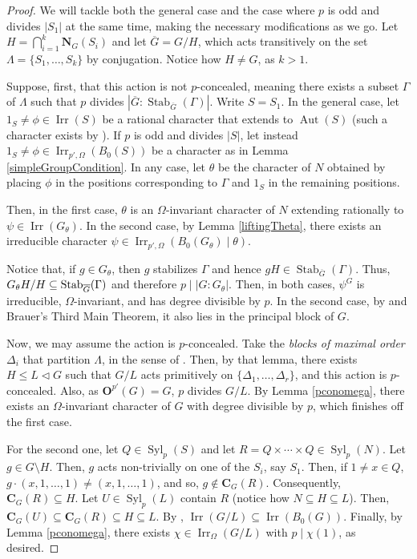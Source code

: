 \documentclass[12pt]{amsart}
\theoremstyle{theorem}
\theoremstyle{definition}
\newcommand{\bC} {\mathbf C}
\newcommand{\bO}{{\mathbf O}}
\newcommand{\bN} {\mathbf N}
\newcommand{\Aut}{{\operatorname{Aut}}}
\newcommand{\Irr}{{\operatorname{Irr}}}
\newcommand{\Stab}{{\operatorname{Stab}}}
\newcommand{\Syl}{{\operatorname{Syl}}}
\begin{document}
	\begin{proof}
		We will tackle both the general case and the case where $p$ is odd and divides $|S_1|$ at the same time, making the necessary modifications as we go. Let $H = \bigcap_{i=1}^k \bN_{G}(S_i)$ and let $\overline{G} = G/H$, which acts transitively on the set $\Lambda = \{S_1, \ldots, S_k\}$ by conjugation. Notice how $H \neq G$, as $k > 1$.
		
		Suppose, first, that this action is not $p$-concealed, meaning there exists a subset $\Gamma$ of $\Lambda$ such that $p$ divides $|\overline{G}:\Stab_{\overline{G}}(\Gamma)|$. Write $S = S_1$. In the general case, let $1_S \neq \phi \in \Irr(S)$ be a rational character that extends to $\Aut(S)$ (such a character exists by \cite[Lemma 4.1]{HSFTVV}). If $p$ is odd and divides $|S|$, let instead $1_S \neq \phi \in \Irr_{p', \Omega}(B_0(S))$ be a character as in Lemma \ref{simpleGroupCondition}. In any case, let $\theta$ be the character of $N$ obtained by placing $\phi$ in the positions corresponding to $\Gamma$ and $1_S$ in the remaining positions. 
		
		Then, in the first case, $\theta$ is an $\Omega$-invariant character of $N$ extending rationally to $\psi \in \Irr(G_\theta)$. In the second case, by Lemma \ref{liftingTheta}, there exists an irreducible character $\psi \in \Irr_{p', \Omega}(B_0(G_\theta){\mid}\theta)$.
		
		Notice that, if $g \in G_\theta$, then $g$ stabilizes $\Gamma$ and hence $gH \in \Stab_{\overline{G}}(\Gamma)$. Thus, $G_\theta H/H\subseteq {\rm Stab}_{\overline{G}}(\Gamma)$ and therefore $p \mid |G : G_\theta|$. Then, in both cases, $\psi^{G}$ is irreducible, $\Omega$-invariant, and has degree divisible by $p$. In the second case, by \cite[Corollary 6.2]{NavarroBlocks} and Brauer's Third Main Theorem, it also lies in the principal block of $G$.
		
		Now, we may assume the action is $p$-concealed. Take the \textit{blocks of maximal order} $\Delta_i$ that partition $\Lambda$, in the sense of \cite[Lemma 2.4]{MinimalHeights}. Then, by that lemma, there exists $H \leq L \lhd G$ such that $G/L$ acts primitively on $\{\Delta_1, \ldots, \Delta_r\}$, and this action is $p$-concealed. Also, as $\bO^{p'}(G) = G$, $p$ divides $G/L$. By Lemma \ref{pconomega}, there exists an $\Omega$-invariant character of $G$ with degree divisible by $p$, which finishes off the first case.
		
		For the second one, let $Q \in \Syl_p(S)$ and let $R = Q \times \cdots \times Q \in \Syl_p(N)$. Let $g \in G \setminus H$. Then, $g$ acts non-trivially on one of the $S_i$, say $S_1$. Then, if $1 \neq x \in Q$, $g\cdot (x, 1, \ldots, 1) \neq (x, 1, \ldots, 1)$, and so, $g \not \in \bC_G(R)$. Consequently, $\bC_G(R) \subseteq H$. Let $U \in \Syl_p(L)$ contain $R$ (notice how $N \subseteq H \subseteq L$). Then, $\bC_G(U) \subseteq \bC_G(R) \subseteq H \subseteq L$. By \cite[Lemma 4.2]{MinimalHeights}, $\Irr(G/L) \subseteq \Irr(B_0(G))$. Finally, by Lemma \ref{pconomega}, there exists $\chi \in \Irr_\Omega(G/L)$ with $p \mid \chi(1)$, as desired.
	\end{proof}
	
\end{document}
